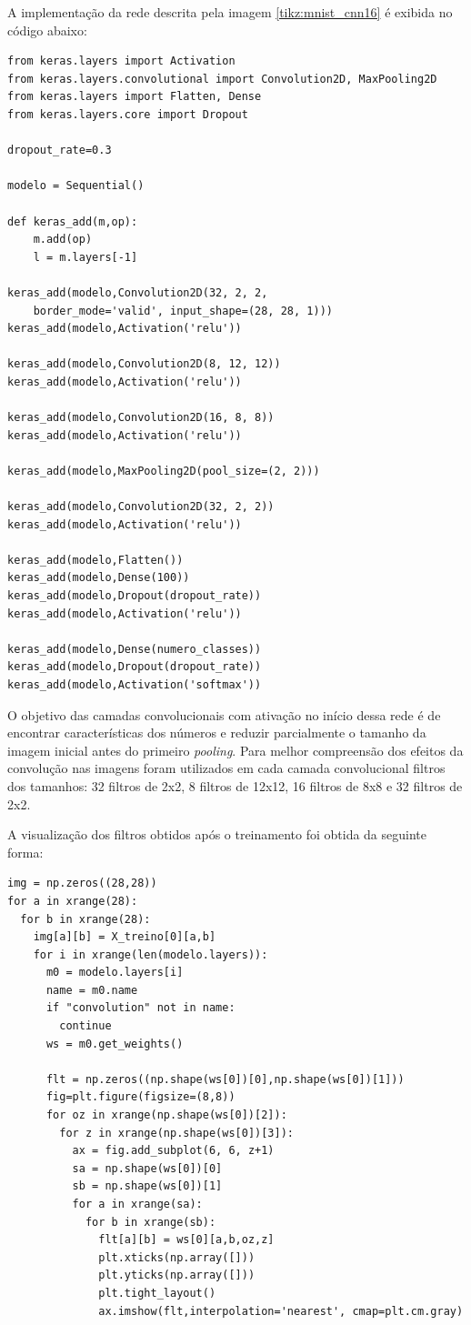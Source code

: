 \documentclass[
	12pt,				%
	oneside,			%
	a4paper,			%
	english,			%
	french,				%
	spanish,			%
	brazil,				%
	]{abntex2}
\begin{document}
\par A implementação da rede descrita pela imagem \ref{tikz:mnist_cnn16} é exibida no código abaixo:
\begin{lstlisting}
from keras.layers import Activation
from keras.layers.convolutional import Convolution2D, MaxPooling2D
from keras.layers import Flatten, Dense
from keras.layers.core import Dropout

dropout_rate=0.3

modelo = Sequential()

def keras_add(m,op):
	m.add(op)
	l = m.layers[-1]

keras_add(modelo,Convolution2D(32, 2, 2,
	border_mode='valid', input_shape=(28, 28, 1)))
keras_add(modelo,Activation('relu'))

keras_add(modelo,Convolution2D(8, 12, 12))
keras_add(modelo,Activation('relu'))

keras_add(modelo,Convolution2D(16, 8, 8))
keras_add(modelo,Activation('relu'))

keras_add(modelo,MaxPooling2D(pool_size=(2, 2)))

keras_add(modelo,Convolution2D(32, 2, 2))
keras_add(modelo,Activation('relu'))

keras_add(modelo,Flatten())
keras_add(modelo,Dense(100))
keras_add(modelo,Dropout(dropout_rate))
keras_add(modelo,Activation('relu'))

keras_add(modelo,Dense(numero_classes))
keras_add(modelo,Dropout(dropout_rate))
keras_add(modelo,Activation('softmax'))
\end{lstlisting}

\par O objetivo das camadas convolucionais com ativação no início dessa rede é de encontrar características dos números e reduzir parcialmente o tamanho da imagem inicial antes do primeiro \textit{pooling}. Para melhor compreensão dos efeitos da convolução nas imagens foram utilizados em cada camada convolucional filtros dos tamanhos: 32 filtros de 2x2, 8 filtros de 12x12, 16 filtros de 8x8 e 32 filtros de 2x2.

\par A visualização dos filtros obtidos após o treinamento foi obtida da seguinte forma:

\begin{lstlisting}
img = np.zeros((28,28))
for a in xrange(28):
  for b in xrange(28):
    img[a][b] = X_treino[0][a,b]
    for i in xrange(len(modelo.layers)):
      m0 = modelo.layers[i]
      name = m0.name
      if "convolution" not in name:
        continue    
      ws = m0.get_weights()

      flt = np.zeros((np.shape(ws[0])[0],np.shape(ws[0])[1]))
      fig=plt.figure(figsize=(8,8))
      for oz in xrange(np.shape(ws[0])[2]):
        for z in xrange(np.shape(ws[0])[3]):
          ax = fig.add_subplot(6, 6, z+1)
          sa = np.shape(ws[0])[0]
          sb = np.shape(ws[0])[1]
          for a in xrange(sa):
            for b in xrange(sb):
              flt[a][b] = ws[0][a,b,oz,z]
              plt.xticks(np.array([]))
              plt.yticks(np.array([]))
              plt.tight_layout()        
              ax.imshow(flt,interpolation='nearest', cmap=plt.cm.gray) 
\end{lstlisting}
\end{document}
